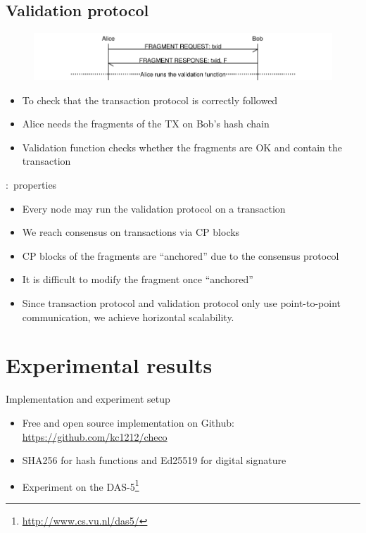 \documentclass{beamer}
\begin{document}
\subsection{Validation protocol}
\begin{frame}{\subsecname}
  \begin{figure}[h]
  \includegraphics[width=1.0\textwidth]{vd-proto}
  \centering
  \end{figure}
\begin{itemize}
\item To check that the transaction protocol is correctly followed
\item Alice needs the fragments of the TX on Bob's hash chain 
\item Validation function checks whether the fragments are OK and contain the transaction
\end{itemize}
\end{frame}

\begin{frame}{\subsecname:~properties}
\begin{itemize}
  \item Every node may run the validation protocol on a transaction
  \item We reach consensus on transactions via CP blocks
  \item CP blocks of the fragments are ``anchored'' due to the consensus protocol
  \item It is difficult to modify the fragment once ``anchored''
  \item Since transaction protocol and validation protocol only use point-to-point communication,
  we achieve horizontal scalability.
\end{itemize}
\end{frame}

\section{Experimental results}
\begin{frame}{Implementation and experiment setup}
  \begin{itemize}
    \item Free and open source implementation on Github:
      \url{https://github.com/kc1212/checo}
    \item SHA256 for hash functions and Ed25519 for digital signature
    \item Experiment on the DAS-5\footnote{\url{http://www.cs.vu.nl/das5/}}
  \end{itemize}
\end{frame}
\end{document}
